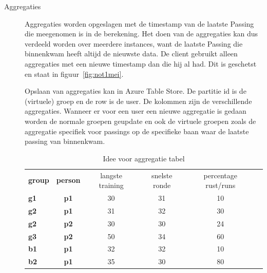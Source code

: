 \begin{description}
\item[Aggregaties] Aggregaties worden opgeslagen met de timestamp van de laatste Passing die meegenomen is in de berekening. Het doen van de aggregaties kan dus verdeeld worden over meerdere instances, want de laatste Passing die binnenkwam heeft altijd de nieuwste data. De client gebruikt alleen aggregaties met een nieuwe timestamp dan die hij al had. Dit is geschetst en staat in figuur~\ref{fig:not1mei}.

Opslaan van aggregaties kan in Azure Table Store. De partitie id is de (virtuele) groep en de row is de user. De kolommen zijn de verschillende aggregaties. Wanneer er voor een user een nieuwe aggregatie is gedaan worden de normale groepen geupdate en ook de virtuele groepen zoals de aggregatie specifiek voor passings op de specifieke baan waar de laatste passing van binnenkwam.

\begin{table}[h!]
\begin{tabular}{lccccc}
\centering
\textbf{group  } & \textbf{ person } & langste training & snelste ronde & percentage rust/runs \\
\textbf{g1     } & \textbf{ p1     } & 30               & 31            & 10 \\
\textbf{g2     } & \textbf{ p1     } & 31               & 32            & 30 \\
\textbf{g2     } & \textbf{ p2     } & 30               & 30            & 24 \\
\textbf{g3     } & \textbf{ p2     } & 50               & 34            & 60 \\
\textbf{b1     } & \textbf{ p1     } & 32               & 32            & 10 \\
\textbf{b2     } & \textbf{ p1     } & 35               & 30            & 80 \\
\end{tabular}
\label{tab:tablestore} 
\caption{Idee voor aggregatie tabel}
\end{table}

\end{description}